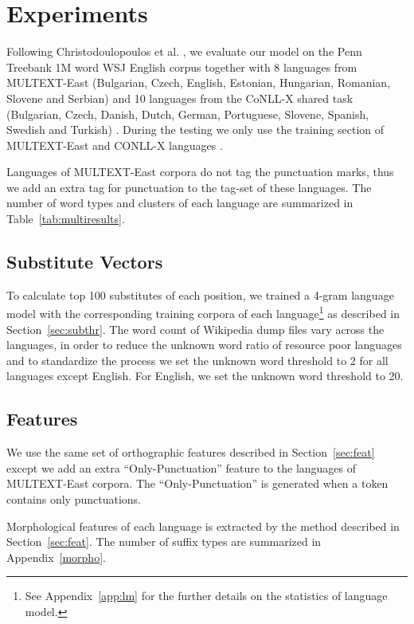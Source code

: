 \section{Experiments}
\label{sec:multilang}
 

Following Christodoulopoulos et
al. , we
evaluate our model on the Penn Treebank 1M word WSJ English corpus
together with 8 languages from MULTEXT-East (Bulgarian, Czech,
English, Estonian, Hungarian, Romanian, Slovene and Serbian)
\cite{citeulike:5820223} and 10 languages from the CoNLL-X shared task
(Bulgarian, Czech, Danish, Dutch, German, Portuguese, Slovene,
Spanish, Swedish and Turkish)
\cite{Buchholz:2006:CST:1596276.1596305}.  During the testing we only
use the training section of MULTEXT-East and CONLL-X languages
\cite{Lee:2010:STU:1870658.1870741}.

Languages of MULTEXT-East corpora do not tag the punctuation marks,
thus we add an extra tag for punctuation to the tag-set of these
languages.  The number of word types and clusters of each language are
summarized in Table~\ref{tab:multiresults}.

\subsection{Substitute Vectors}
To calculate top 100 substitutes of each position, we trained a 4-gram
language model with the corresponding training corpora of each
language\footnote{See Appendix~\ref{app:lm} for the further details on
  the statistics of language model.}  as described in
Section~\ref{sec:subthr}.  The word count of Wikipedia dump files vary
across the languages, in order to reduce the unknown word ratio of
resource poor languages and to standardize the process we set the
unknown word threshold to 2 for all languages except English.  For
English, we set the unknown word threshold to 20.

\subsection{Features}
We use the same set of orthographic features described in
Section~\ref{sec:feat} except we add an extra ``Only-Punctuation''
feature to the languages of MULTEXT-East corpora.  The
``Only-Punctuation'' is generated when a token contains only
punctuations.  

Morphological features of each language is extracted by the method
described in Section~\ref{sec:feat}.  The number of suffix types are
summarized in Appendix~\ref{morpho}.

